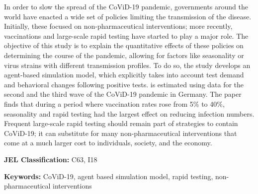 \noindent
In order to slow the spread of the CoViD-19 pandemic, governments around the world have
enacted a wide set of policies limiting the transmission of the disease. Initially,
these focused on non-pharmaceutical interventions; more recently, vaccinations and
large-scale rapid testing have started to play a major role. The objective of this study
is to explain the quantitative effects of these policies on determining the course of
the pandemic, allowing for factors like seasonality or virus strains with different
transmission profiles. To do so, the study develops an agent-based simulation model,
which explicitly takes into account test demand and behavioral changes following
positive tests. is estimated using data for the second and the third wave of the
CoViD-19 pandemic in Germany. The paper finds that during a period where vaccination
rates rose from 5\% to 40\%, seasonality and rapid testing had the largest effect on
reducing infection numbers. Frequent large-scale rapid testing should remain part of
strategies to contain CoViD-19; it can substitute for many non-pharmaceutical
interventions that come at a much larger cost to individuals, society, and the economy.

\vspace{1cm}
\noindent \textbf{JEL Classification:} C63, I18

\noindent \textbf{Keywords:} CoViD-19, agent based simulation model, rapid testing,
non-pharmaceutical interventions